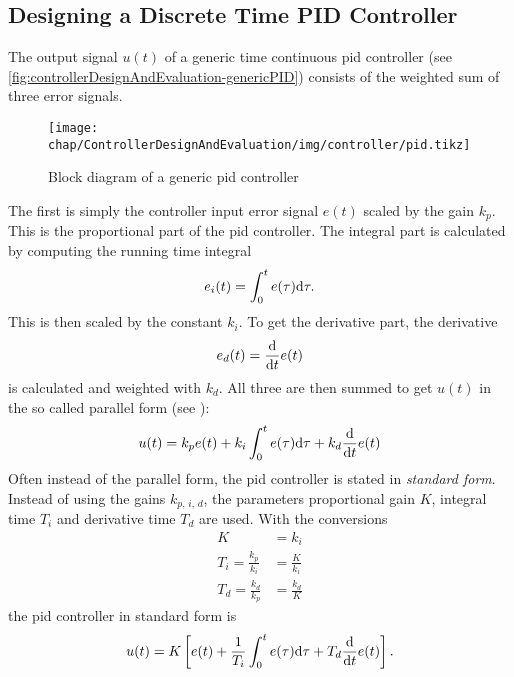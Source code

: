\subsection{Designing a Discrete Time PID Controller}\label{sec:controlDesign}
The output signal $u(t)$ of a generic time continuous \gls{pid} controller (see \autoref{fig:controllerDesignAndEvaluation-genericPID}) consists of the weighted sum of three error signals.

\begin{figure}[tb]
	\centering
	\texttt{[image: chap/ControllerDesignAndEvaluation/img/controller/pid.tikz]}
	\caption[Block diagram of a PID controller]{Block diagram of a generic \gls{pid} controller}
	\label{fig:controllerDesignAndEvaluation-genericPID}
\end{figure}
The first is simply the controller input error signal $e(t)$ scaled by the gain $k_p$. This is the proportional part of the \gls{pid} controller. The integral part is calculated by computing the running time integral
\begin{equation}\label{eq:ei}
e_i(t)=\int_{0}^{t} e(\tau) \text{d}{\tau}.
\end{equation}
This is then scaled by the constant $k_i$. To get the derivative part, the derivative
\begin{equation}\label{eq:ed}
e_d(t)=\frac{\text{d}{}}{\text{d}{t}} e(t)
\end{equation}
is calculated and weighted with $k_d$.
All three are then summed to get $u(t)$ in the so called parallel form (see \cite[p.~5]{Dodds2015}):
\begin{equation}
u(t)=k_p e(t) + k_i \int_{0}^{t} e(\tau) \text{d}{\tau} + k_d \frac{\text{d}{}}{\text{d}{t}} e(t)
\end{equation}
Often instead of the parallel form, the \gls{pid} controller is stated in \textit{standard form}. Instead of using the gains $k_{p,\,i,\,d}$, the parameters proportional gain $K$, integral time $T_i$ and derivative time $T_d$ are used. \cite[p.~76]{Aastroem1995} With the conversions
\begin{align}
K&=k_i\\
T_i=\frac{k_p}{k_i}&=\frac{K}{k_i}\\
T_d=\frac{k_d}{k_p}&=\frac{k_d}{K}
\end{align}
the \gls{pid} controller in standard form is
\begin{equation}
u(t)=K\left[e(t) + \frac{1}{T_i} \int_{0}^{t} e(\tau) \text{d}{\tau} + T_d \frac{\text{d}{}}{\text{d}{t}} e(t)\right].
\end{equation}
